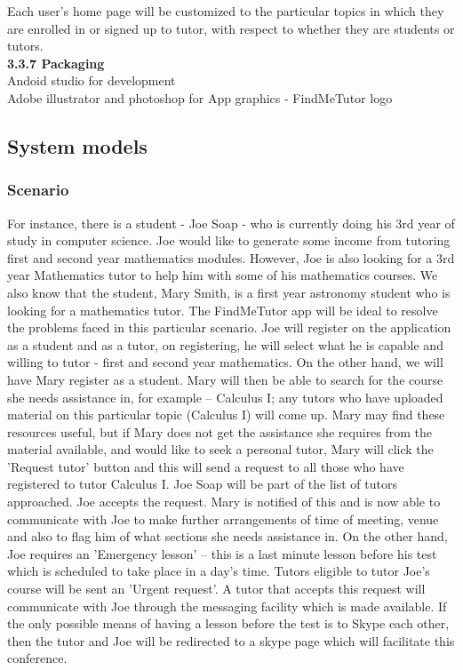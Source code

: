 \documentclass[12pt]{article}
\begin{document}
{Each user's home page will be customized to the particular topics in which they are enrolled in or signed up to tutor, with respect to whether they are students or tutors. \\
\textbf{3.3.7 Packaging}\\
Andoid studio for development\\
Adobe illustrator and photoshop for App graphics - FindMeTutor logo\\
}
\subsection{System models}

\subsubsection{Scenario}
\begin{flushleft}
For instance, there is a student - Joe Soap - who is currently doing his  3rd year of study in computer science.  Joe would like to generate some income from tutoring first and second year mathematics modules. However, Joe is also looking for a 3rd year Mathematics tutor to help him with some of his mathematics courses. We also know that the student, Mary Smith, is a first year astronomy student who is looking for a mathematics tutor. The FindMeTutor app will be ideal to resolve the problems faced in this particular scenario. Joe will register on the application as a student and as a tutor, on registering, he will select what he is capable and willing to tutor - first and second year mathematics. On the other hand, we will have Mary register as a student. Mary will then be able to search for the course she needs assistance in, for example – Calculus I; any tutors who have uploaded material on this particular topic (Calculus I) will come up. Mary may find these resources useful, but if Mary does not get the assistance she requires from the material available, and would like to seek a personal tutor, Mary will click the 'Request tutor' button and this will send a request to all those who have registered to tutor Calculus I. Joe Soap will be part of the list of tutors approached. Joe accepts the request. Mary is notified of this and is now able to communicate with Joe to make further arrangements of time of meeting, venue and also to flag him of what sections she needs assistance in. On the other hand, Joe requires an 'Emergency lesson' – this is a last minute lesson before his test which is scheduled to take place in a day's time. Tutors eligible to tutor Joe's course will be sent an 'Urgent request'. A tutor that accepts this request will communicate with Joe through the messaging facility which is made available. If the only possible means of having a lesson before the test is to Skype each other, then the tutor and Joe will be redirected to a skype page which will facilitate this conference.
\end{flushleft}
\end{document}
